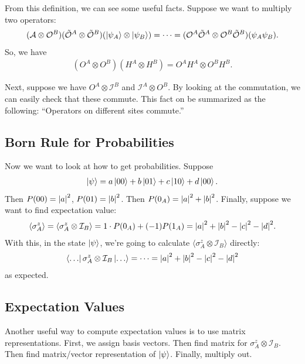 \documentclass{book}
\theoremstyle{definition}
\newcommand{\Id}{\mathcal{I}}
\begin{document}
From this definition, we can see some useful facts. Suppose we want to multiply two operators: 
\begin{align}
(\mathcal{A} \otimes \mathcal{O}^B)(\tilde{\mathcal{O}}^A \otimes \tilde{\mathcal{O}}^B )(\ket{\psi_A} \otimes \ket{\psi_B}) = \dots = (\mathcal{O}^A\tilde{\mathcal{O}}^A \otimes \mathcal{O}^B\tilde{\mathcal{O}}^B)(\psi_A\psi_B).
\end{align}
So, we have
\begin{align}
(O^A \otimes O^B)(H^A \otimes H^B)= O^A H^A \otimes O^B H^B. 
\end{align}

Next, suppose we have $O^A \otimes \Id^B$ and $\Id^A \otimes O^B$. By looking at the commutation, we can easily check that these commute. This fact on be summarized as the following: ``Operators on different sites commute.'' \\


\subsection{Born Rule for Probabilities}

Now we want to look at how to get probabilities. Suppose
\begin{align}
\ket{\psi} = a\ket{00} + b\ket{01} + c\ket{10} + d\ket{00}.
\end{align}
Then $P(00) = \abs{a}^2$, $P(01) = \abs{b}^2$. Then $P(0_A) = \abs{a}^2 + \abs{b}^2$. Finally, suppose we want to find expectation value:
\begin{align}
\langle \sigma^z_A \rangle = \langle \sigma^z_A \otimes \Id_B \rangle = 1\cdot P(0_A) + (-1)P(1_A) = \abs{a}^2 + \abs{b}^2 - \abs{c}^2 - \abs{d}^2.
\end{align}
With this, in the state $\ket{\psi}$, we're going to calculate $\langle \sigma^z_A \otimes \Id_B\rangle $ directly:
\begin{align}
\bra{\dots} \sigma^z_A \otimes \Id_B\ket{\dots} = \dots =  \abs{a}^2 + \abs{b}^2 - \abs{c}^2 - \abs{d}^2
\end{align}
as expected.



\subsection{Expectation Values}

Another useful way to compute expectation values is to use matrix representations. First, we assign basis vectors. Then find matrix for $\sigma_A^z \otimes \Id_B$. Then find matrix/vector representation of $\ket{\psi}$. Finally, multiply out. \\
\end{document}
